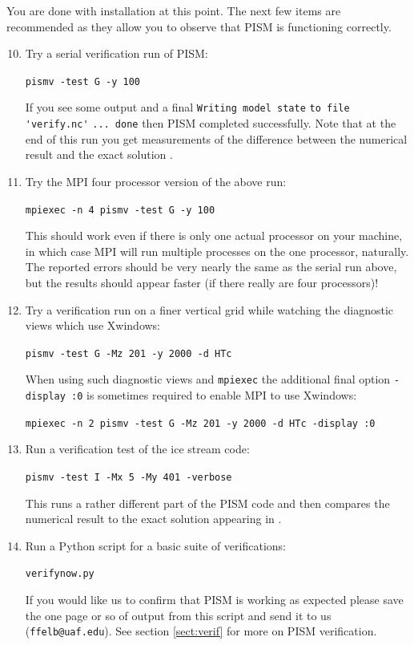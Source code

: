 \documentclass[11pt,final]{amsart}
\begin{document}
\bigskip
You are done with installation at this point.  The next few items are recommended as they allow you to observe that PISM is functioning correctly.
\bigskip

\begin{enumerate}\setcounter{enumi}{9}
\item \label{serialpismvrun} Try a serial verification run of PISM:

\verb|pismv -test G -y 100|

\noindent If you see some output and a final \verb|Writing model state| \verb|to file 'verify.nc'| \verb|... done| then PISM completed successfully.  Note that at the end of this run you get measurements of the difference between the numerical result and the exact solution \cite{BBL}.

\item Try the MPI four processor version of the above run:

\verb|mpiexec -n 4 pismv -test G -y 100|

\noindent This should work even if there is only one actual processor on your machine, in which case MPI will run multiple processes on the one processor, naturally.  The reported errors should be very nearly the same as the serial run above, but the results should appear faster (if there really are four processors)!

\item Try a verification run on a finer vertical grid while watching the diagnostic views which use Xwindows:

\verb|pismv -test G -Mz 201 -y 2000 -d HTc|

\noindent When using such diagnostic views and \verb|mpiexec| the additional final option \verb|-display :0| is sometimes required to enable MPI to use Xwindows:

\verb|mpiexec -n 2 pismv -test G -Mz 201 -y 2000 -d HTc -display :0|

\item Run a verification test of the ice stream code:

\verb|pismv -test I -Mx 5 -My 401 -verbose|

\noindent This runs a rather different part of the PISM code and then compares the numerical result to the exact solution appearing in \cite{SchoofStream}.

\item Run a Python script for a basic suite of verifications:

\verb|verifynow.py|

\noindent If you would like us to confirm that PISM is working as expected please save the one page or so of output from this script and send it to us (\verb|ffelb@uaf.edu|).  See section \ref{sect:verif} for more on PISM verification.
\end{enumerate}
\bigskip
\end{document}
